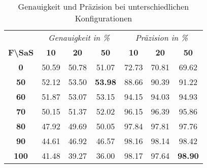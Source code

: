 \begin{table}[h]
    \centering
    \begin{tabular}{ c | c c c | c c c }
        &   \multicolumn{3}{c}{\textit{Genauigkeit in \%}}    &   \multicolumn{3}{c}{\textit{Präzision in \%}} \\
        \textbf{F\textbackslash SaS} & \textbf{10} & \textbf{20} & \textbf{50} & \textbf{10} & \textbf{20} & \textbf{50}  \\
        \hline
        \textbf{0}      &   50.59 &   50.78 &   51.07         &   72.73 &   70.81 &   69.62 \\
        \textbf{50}     &   52.12 &   53.50 &   \textbf{53.98}&   88.66 &   90.39 &   91.22 \\
        \textbf{60}     &   51.87 &   53.07 &   53.15         &   94.15 &   94.03 &   94.93 \\
        \textbf{70}     &   50.15 &   51.37 &   52.02         &   96.15 &   96.39 &   95.86 \\
        \textbf{80}     &   47.92 &   49.69 &   50.05         &   97.84 &   97.81 &   97.76 \\
        \textbf{90}     &   44.61 &   46.92 &   46.57         &   98.16 &   98.14 &   98.42 \\
        \textbf{100}    &   41.48 &   39.27 &   36.00         &   98.17 &   97.64 &   \textbf{98.90}

    \end{tabular}
    \caption{Genauigkeit und Präzision bei unterschiedlichen Konfigurationen}
    \label{tab:accuracy-precision}
\end{table}